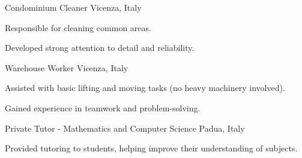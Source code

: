 

\begin{cventries}

  \cventry
    {Condominium Cleaner} %
    {} %
    {Vicenza, Italy} %
    {} %
    {
    \begin{cvitems}
    		\item Responsible for cleaning common areas.
    		\item Developed strong attention to detail and reliability.
    \end{cvitems}
    }
\hfill \break
  \cventry
    {Warehouse Worker} %
    {} %
	{Vicenza, Italy} %
    {} %
    {
      \begin{cvitems} %
        \item {Assisted with basic lifting and moving tasks (no heavy machinery involved)}.
        \item {Gained experience in teamwork and problem-solving}.
      \end{cvitems}
    }
\hfill \break
  \cventry
    {Private Tutor - Mathematics and Computer Science} %
    {} %
	{Padua, Italy} %
    {} %
    {
      \begin{cvitems} %
        \item {Provided tutoring to students, helping improve their understanding of subjects}.
      \end{cvitems}
    }

\end{cventries}
